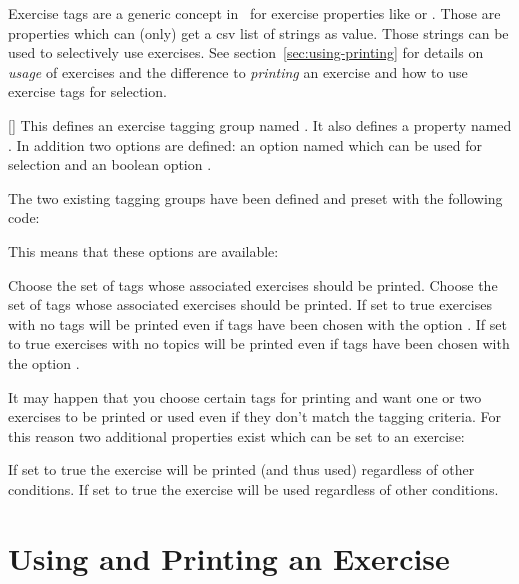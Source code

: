 \documentclass{xsim-manual}
\begin{document}
Exercise tags are a generic concept in \xsim\ for exercise properties like
 or .  Those are properties which can (only)
get a csv list of strings as value.  Those strings can be used to selectively
use exercises.  See section~\vref{sec:using-printing} for details on
\emph{usage} of exercises and the difference to \emph{printing} an exercise
and how to use exercise tags for selection.
\begin{commands}
  []
    This defines an exercise tagging group named .  It also defines a
    property named .  In addition two options are defined: an option
    named  which can be used for selection and an boolean
    option .
\end{commands}
The two existing tagging groups have been defined and preset with the
following code:
\begin{sourcecode}
\end{sourcecode}
This means that these options are available:
\begin{options}
    Choose the set of tags whose associated exercises should be printed.
    Choose the set of tags whose associated exercises should be printed.
    If set to true exercises with no tags will be printed even if tags have
    been chosen with the option .
    If set to true exercises with no topics will be printed even if tags have
    been chosen with the option .
\end{options}

It may happen that you choose certain tags for printing and want one or two
exercises to be printed or used even if they don't match the tagging
criteria.  For this reason two additional properties exist which can be set to
an exercise:\label{property:print!}
\begin{properties}
    If set to true the exercise will be printed (and thus used) regardless of
    other conditions.
    If set to true the exercise will be used regardless of other conditions.
\end{properties}

\section{Using and Printing an Exercise}\label{sec:using-printing}
\end{document}
